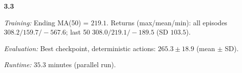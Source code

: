 \noindent\textbf{3.3}\par
\emph{Training:} Ending MA(50) = $219.1$. Returns (max/mean/min): all episodes $308.2/159.7/-567.6$; last 50 $308.0/219.1/-189.5$ (SD $103.5$).\par
\emph{Evaluation:} Best checkpoint, deterministic actions: $265.3\pm 18.9$ (mean $\pm$ SD).\par
\emph{Runtime:} $35.3$ minutes (parallel run).\par
